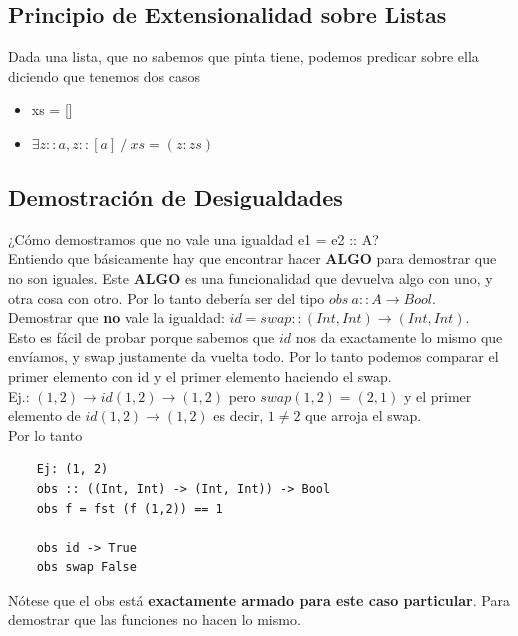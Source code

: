 \documentclass[10pt,a4paper]{article}
\begin{document}
\subsection*{Principio de Extensionalidad sobre Listas}
Dada una lista, que no sabemos que pinta tiene, podemos predicar sobre ella diciendo que tenemos dos casos 
\begin{itemize}
    \item xs = []
    \item $\exists z::a, z::[a] \ / \ xs = (z:zs)$
\end{itemize}
\subsection*{Demostración de Desigualdades}
¿Cómo demostramos que no vale una igualdad e1 = e2 :: A? \\
Entiendo que básicamente hay que encontrar hacer \textbf{ALGO} para demostrar que no son iguales. Este \textbf{ALGO} es una funcionalidad que devuelva algo con uno, y otra cosa con otro. Por lo tanto debería ser del tipo $obs \ a :: A \rightarrow Bool$. \\
Demostrar que \textbf{no} vale la igualdad: $id = swap :: (Int, Int) \rightarrow (Int, Int)$. \\
Esto es fácil de probar porque sabemos que $id$ nos da exactamente lo mismo que envíamos, y swap justamente da vuelta todo. Por lo tanto podemos comparar el primer elemento con id y el primer elemento haciendo el swap. \\
Ej.: $(1, 2) \rightarrow id (1, 2) \rightarrow (1, 2)$ pero $swap (1, 2) = (2, 1)$ y el primer elemento de $id (1, 2) \rightarrow (1, 2)$ es decir, $1 \neq 2$ que arroja el swap. \\
Por lo tanto
\begin{lstlisting}
    Ej: (1, 2)
    obs :: ((Int, Int) -> (Int, Int)) -> Bool 
    obs f = fst (f (1,2)) == 1

    obs id -> True 
    obs swap False
\end{lstlisting}
Nótese que el obs está \textbf{exactamente armado para este caso particular}. Para demostrar que las funciones no hacen lo mismo.
\end{document}
